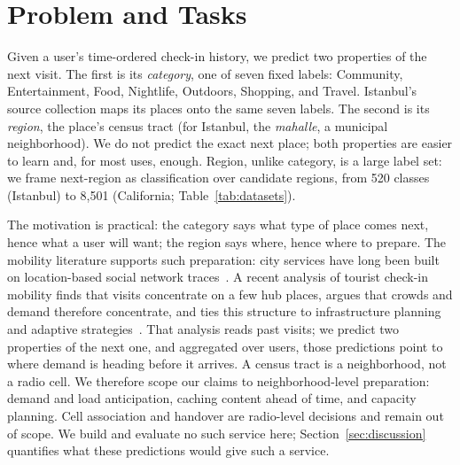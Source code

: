 \section{Problem and Tasks}
\label{sec:problem}

Given a user's time-ordered check-in history, we predict two properties of the next visit. The first is its \emph{category}, one of seven fixed labels: Community, Entertainment, Food,
Nightlife, Outdoors, Shopping, and Travel. Istanbul's source collection maps its places onto the same seven labels. The second is its \emph{region}, the place's census tract (for Istanbul, the \emph{mahalle}, a municipal neighborhood). We do not predict the exact next place; both properties are easier to learn and, for most uses, enough. Region, unlike category, is a large label set: we frame next-region as classification over candidate regions, from 520 classes (Istanbul) to 8,501 (California; Table~\ref{tab:datasets}).

The motivation is practical: the category says what type of place comes next, hence what a user will want; the region says where, hence where to prepare. The mobility literature supports such preparation: city services have long been built on location-based social network traces~\cite{silva2019urbancomputing}. A recent analysis of tourist check-in
mobility finds that visits concentrate on a few hub places, argues that crowds and demand therefore concentrate, and ties this structure to
infrastructure planning and adaptive strategies~\cite{moura2025mobilityaware}.
That analysis reads past visits; we predict two properties of
the next one, and aggregated over users, those predictions point to where
demand is heading before it arrives. A census
tract is a neighborhood, not a radio cell. We therefore scope our claims to
neighborhood-level preparation: demand and load anticipation, caching content
ahead of time, and capacity planning. Cell association and handover are
radio-level decisions and remain out of scope. We build and evaluate no such
service here; Section~\ref{sec:discussion} quantifies what these predictions
would give such a service.
